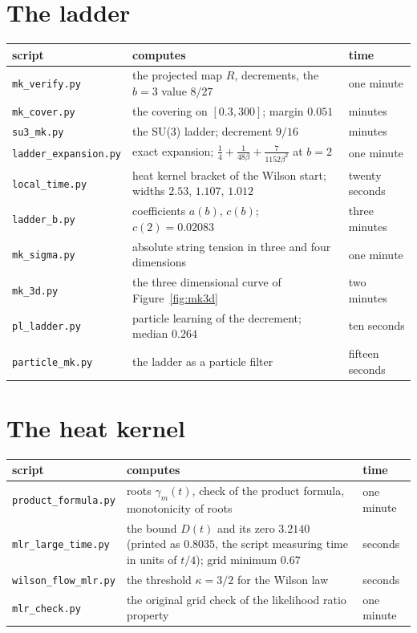 \section{The ladder}
\begin{center}
\footnotesize
\begin{tabular}{p{1.3in}p{2.05in}p{0.7in}}
\toprule
script & computes & time \\ \midrule
\texttt{mk\_verify.py} & the projected map $R$, decrements, the $b=3$ value $8/27$ & one minute \\
\texttt{mk\_cover.py} & the covering on $[0.3,300]$; margin $0.051$ & minutes \\
\texttt{su3\_mk.py} & the SU(3) ladder; decrement $9/16$ & minutes \\
\texttt{ladder\_}\allowbreak\texttt{expansion.py} & exact expansion; $\frac14+\frac1{48\beta}+\frac{7}{1152\beta^2}$ at $b=2$ & one minute \\
\texttt{local\_time.py} & heat kernel bracket of the Wilson start; widths $2.53$, $1.107$, $1.012$ & twenty seconds \\
\texttt{ladder\_b.py} & coefficients $a(b)$, $c(b)$; $c(2)=0.02083$ & three minutes \\
\texttt{mk\_sigma.py} & absolute string tension in three and four dimensions & one minute \\
\texttt{mk\_3d.py} & the three dimensional curve of Figure~\ref{fig:mk3d} & two minutes \\
\texttt{pl\_ladder.py} & particle learning of the decrement; median $0.264$ & ten seconds \\
\texttt{particle\_mk.py} & the ladder as a particle filter & fifteen seconds \\
\bottomrule
\end{tabular}
\end{center}

\section{The heat kernel}
\begin{center}
\footnotesize
\begin{tabular}{p{1.3in}p{2.05in}p{0.7in}}
\toprule
script & computes & time \\ \midrule
\texttt{product\_}\allowbreak\texttt{formula.py} & roots $\gamma_m(t)$, check of the product formula, monotonicity of roots & one minute \\
\texttt{mlr\_large\_}\allowbreak\texttt{time.py} & the bound $D(t)$ and its zero $3.2140$ (printed as $0.8035$, the script measuring time in units of $t/4$); grid minimum $0.67$ & seconds \\
\texttt{wilson\_flow\_}\allowbreak\texttt{mlr.py} & the threshold $\kappa=3/2$ for the Wilson law & seconds \\
\texttt{mlr\_check.py} & the original grid check of the likelihood ratio property & one minute \\
\bottomrule
\end{tabular}
\end{center}

